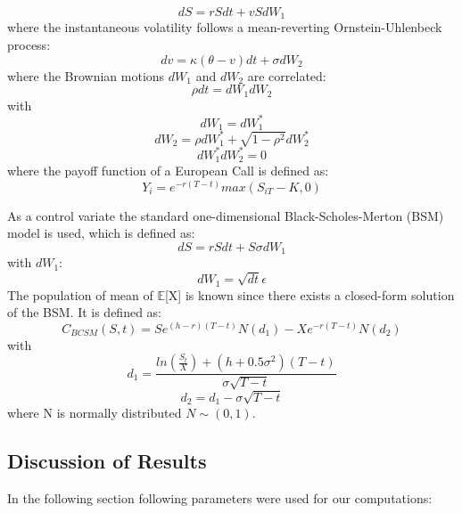 \documentclass[a4paper,11pt]{article}
\begin{document}
\begin{equation}
dS=rSdt + vSdW_1
\label{s}
\end{equation}
where the instantaneous volatility follows a mean-reverting Ornstein-Uhlenbeck process:
\begin{equation}
dv=\kappa(\theta - v)dt + \sigma dW_2
\label{vola}
\end{equation}
where the Brownian motions $dW_1$ and $dW_2$ are correlated: 
\begin{equation*}
\rho dt= dW_1 dW_2
\end{equation*}
with
\begin{equation*}
dW_1=dW_1^*
\end{equation*}
\begin{equation*}
dW_2= \rho dW_1^* + \sqrt{1-\rho^2} dW_2^*
\end{equation*}
\begin{equation*}
dW_1^* dW_2^* = 0
\end{equation*}
where the payoff function of a European Call is defined as:
\begin{equation}
Y_i = e^{-r(T-t)}max(S_{iT}-K,0)
\end{equation}

As a control variate the standard one-dimensional Black-Scholes-Merton (BSM) model is used, which is defined as:
\begin{equation}
dS= rSdt + S \sigma dW_1
\label{BCSM}
\end{equation}
with $dW_1$:
\begin{equation*}
dW_1 = \sqrt{dt} \epsilon
\end{equation*}
The population of mean of $\mathbb{E}$[X] is known since there exists a closed-form solution of the BSM. It is defined as:
\begin{equation}
C_{BCSM}(S,t)=S e^{(h-r)(T-t)}N(d_1)-Xe^{-r(T-t)}N(d_2)
\label{BCSM}
\end{equation}
with
\begin{equation*}
d_1=\frac{ln(\frac{S_t}{X})+(h+0.5\sigma^2)(T-t)}{\sigma \sqrt{T-t}}
\end{equation*}
\begin{equation*}
d_2=d_1-\sigma\sqrt{T-t}
\end{equation*}
where N is normally distributed $N \sim (0,1)$.
\subsection{Discussion of Results}
In the following section following parameters were used for our computations:
\end{document}
